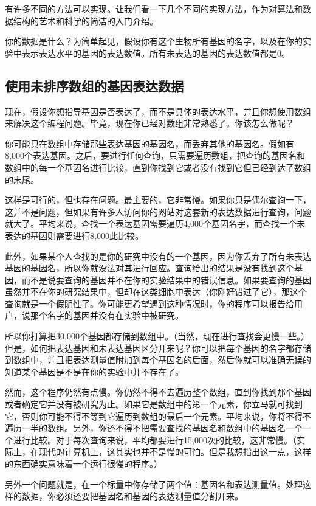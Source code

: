 有许多不同的方法可以实现。让我们看一下几个不同的实现方法，作为对算法和数据结构的艺术和科学的简洁的入门介绍。

你的数据是什么？为简单起见，假设你有这个生物所有基因的名字，以及在你的实验中表示表达水平的基因的表达数值。所有未表达的基因的表达数值都是0。

\subsection{使用未排序数组的基因表达数据}
现在，假设你想指导基因是否表达了，而不是具体的表达水平，并且你想使用数组来解决这个编程问题。毕竟，现在你已经对数组非常熟悉了。你该怎么做呢？

你可能只在数组中存储那些表达基因的基因名，而丢弃其他的基因名。假如有8,000个表达基因。之后，要进行任何查询，只需要遍历数组，把查询的基因名和数组中的每一个基因名进行比较，直到你找到它或者没有找到它但已经到达了数组的末尾。

这样是可行的，但也存在问题。最主要的，它非常慢。如果你只是偶尔查询一下，这并不是问题，但如果有许多人访问你的网站对这套新的表达数据进行查询，问题就大了。平均来说，查找一个表达基因需要遍历4,000个基因名字，而查找一个未表达的基因则需要进行8,000此比较。

此外，如果某个人查找的是你的研究中没有的一个基因，因为你丢弃了所有未表达基因的基因名，所以你就没法对其进行回应。查询给出的结果是没有找到这个基因，而不是说要查询的基因并不在你的实验结果中的错误信息。如果要查询的基因虽然并不在你的研究结果中，但却在这类细胞中表达（你刚好错过了它），那这个查询就是一个假阴性了。你可能更希望遇到这种情况时，你的程序可以报告给用户，说那个名字的基因并没有在实验中被研究。

所以你打算把30,000个基因都存储到数组中。（当然，现在进行查找会更慢一些。）但是，如何把表达基因和未表达基因区分开来呢？你可以把每个基因的名字都存储到数组中，并且把表达测量值附加到每个基因名的后面，然后你就可以准确无误的知道某个基因是不是在你的实验中并不存在了。

然而，这个程序仍然有点慢。你仍然不得不去遍历整个数组，直到你找到那个基因或者确定它并没有被研究为止。如果它是数组中的第一个元素，你立马就可找到它，否则你可能不得不等到它遍历到数组的最后一个元素。平均来说，你将不得不遍历一半的数组。另外，你还不得不把需要查找的基因名和数组中的基因名一个一个进行比较。对于每次查询来说，平均都要进行15,000次的比较，这非常慢。（实际上，在现代的计算机上，这其实也并不是慢的可怕。但是我想指出这一点，这样的东西确实意味着一个运行很慢的程序。）

另外一个问题就是，在一个标量中你存储了两个值：基因名和表达测量值。处理这样的数据，你必须还要把基因名和基因的表达测量值分割开来。

